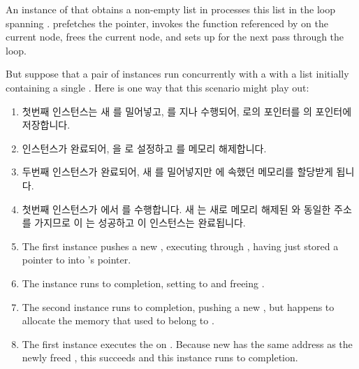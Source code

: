 \begin{fcvref}
\begin{fcvref}
An instance of  that obtains a non-empty list in
 processes this list in the loop spanning
.
 prefetches the  pointer,
 invokes the function referenced by  on the
current node,
 frees the current node, and
 sets up  for the next pass through the loop.

But suppose that a pair of  instances run concurrently
with a  with a list initially containing a single
.
Here is one way that this scenario might play out:

\fi

\begin{enumerate}
\item	첫번째  인스턴스는 새  를 밀어넣고,
	 를 지나 수행되어,  로의 포인터를  의
	 포인터에 저장합니다.
\item	{} 인스턴스가 완료되어,  을  로
	설정하고  를 메모리 해제합니다.
\item	두번째  인스턴스가 완료되어, 새  를 밀어넣지만
	 에 속했던 메모리를 할당받게 됩니다.
\item	첫번째  인스턴스가  에서
	 를 수행합니다.
	새  는 새로 메모리 해제된  와 동일한 주소를 가지므로 이
	 는 성공하고 이  인스턴스는 완료됩니다.

\iffalse

\item	The first  instance pushes a new ,
	executing through , having just stored
	a pointer to  into 's  pointer.
\item	The  instance runs to completion,
	setting  to  and freeing .
\item	The second  instance runs to completion,
	pushing a new , but happens to allocate the memory
	that used to belong to .
\item	The first  instance executes the 
	on .
	Because new  has the same address as the newly freed ,
	this  succeeds and this  instance
	runs to completion.


\end{enumerate}
\end{fcvref}
\end{fcvref}
